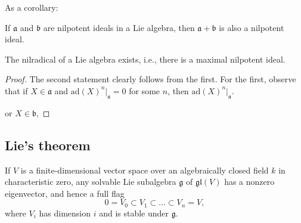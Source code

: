 As a corollary:

\begin{proposition}
 \label{proposition-nilradical-exists}
If $\mathfrak a$ and $\mathfrak b$ are nilpotent ideals in a Lie algebra, then $\mathfrak a+\mathfrak b$ is also a nilpotent ideal. 

The nilradical of a Lie algebra exists, i.e., there is a maximal nilpotent ideal.
\end{proposition}

\begin{proof}
 The second statement clearly follows from the first. For the first, observe that if $X\in \mathfrak a$ and $\text{ad}(X)^n|_{\mathfrak a} = 0$ for some $n$, then $\text{ad}(X)^n|_{\mathfrak a}$.
 
 or $X\in\mathfrak b$, 
\end{proof}



\subsection{Lie's theorem}
\label{subsection-Lie-theorem}

\begin{theorem}
\label{theorem-Lie}
 If $V$ is a finite-dimensional vector space over an algebraically closed field $k$ in characteristic zero, any solvable Lie subalgebra $\mathfrak g$ of $\mathfrak{gl}(V)$ has a nonzero eigenvector, and hence a full flag
 $$ 0=V_0 \subset V_1 \subset \dots \subset V_n=V,$$
 where $V_i$ has dimension $i$ and is stable under $\mathfrak g$.
\end{theorem}

